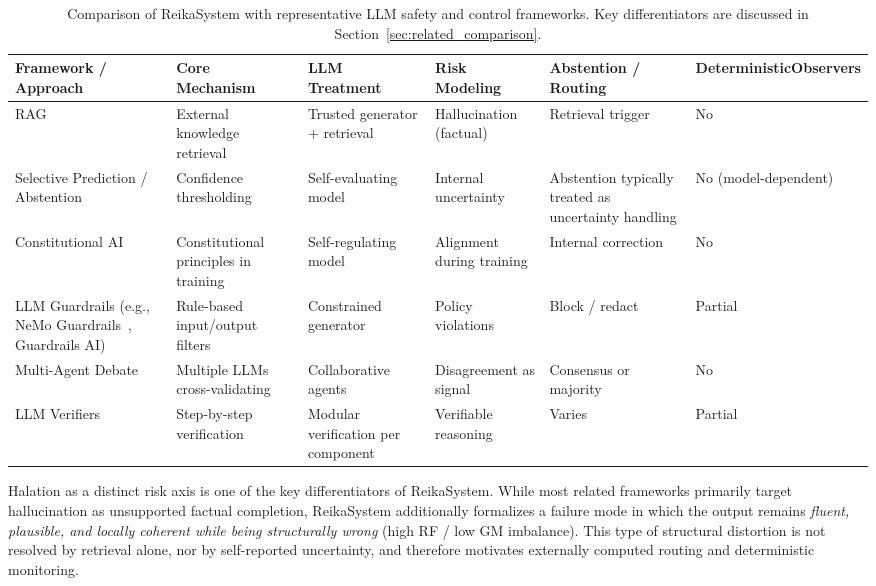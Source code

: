\documentclass[11pt,a4paper]{article}
\begin{document}
\begin{table}[t]
\centering
\footnotesize
\setlength{\tabcolsep}{2.5pt}
\renewcommand{\arraystretch}{1.08}
\caption{Comparison of ReikaSystem with representative LLM safety and control frameworks.
Key differentiators are discussed in Section~\ref{sec:related_comparison}.}
\label{tab:related_frameworks}
\begin{tabularx}{\textwidth}{@{}%
>{\raggedright\arraybackslash}p{2.45cm}%
>{\raggedright\arraybackslash}X%
>{\raggedright\arraybackslash}X%
>{\raggedright\arraybackslash}X%
>{\raggedright\arraybackslash}X%
>{\centering\arraybackslash}p{1.85cm}@{}}
\toprule
\textbf{Framework / Approach} &
\textbf{Core Mechanism} &
\textbf{LLM Treatment} &
\textbf{Risk Modeling} &
\textbf{Abstention / Routing} &
\textbf{Deterministic\newline Observers} \\
\midrule
RAG~\cite{lewis2020rag}
&
External knowledge retrieval
&
Trusted generator + retrieval
&
Hallucination (factual)
&
Retrieval trigger
&
No
\\

Selective Prediction / Abstention~\cite{geifman2017selective}
&
Confidence thresholding
&
Self-evaluating model
&
Internal uncertainty
&
Abstention typically treated as uncertainty handling
&
No (model-dependent)
\\

Constitutional AI~\cite{bai2022constitutional}
&
Constitutional principles in training
&
Self-regulating model
&
Alignment during training
&
Internal correction
&
No
\\

LLM Guardrails (e.g., NeMo Guardrails~\cite{rebedea2023nemo}, Guardrails AI)
&
Rule-based input/output filters
&
Constrained generator
&
Policy violations
&
Block / redact
&
Partial
\\

Multi-Agent Debate~\cite{du2023improving}
&
Multiple LLMs cross-validating
&
Collaborative agents
&
Disagreement as signal
&
Consensus or majority
&
No
\\

LLM Verifiers~\cite{cobbe2021training}
&
Step-by-step verification
&
Modular verification per component
&
Verifiable reasoning
&
Varies
&
Partial
\\
\bottomrule
\end{tabularx}
\end{table}

Halation as a distinct risk axis is one of the key differentiators of ReikaSystem.
While most related frameworks primarily target hallucination as unsupported factual
completion, ReikaSystem additionally formalizes a failure mode in which the output
remains \emph{fluent, plausible, and locally coherent while being structurally wrong}
(high RF / low GM imbalance). This type of structural distortion is not resolved by
retrieval alone, nor by self-reported uncertainty, and therefore motivates externally
computed routing and deterministic monitoring.
\end{document}
